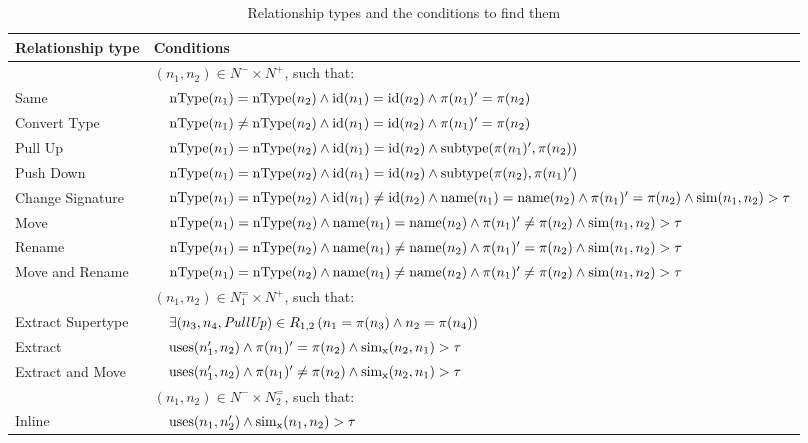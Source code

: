 \begin{table}[htbp]
\renewcommand{\arraystretch}{1.3}
\caption{Relationship types and the conditions to find them}
\label{TabRelationshipTypes}
\centering

\begin{tabular}{@{}lll@{}}
\toprule
Relationship type & \multicolumn{2}{l}{Conditions} \\
\midrule
& \multicolumn{2}{l}{$(n_1, n_2) \in N^- \times N^+$, such that:}\\
Same & & $\operatorname{nType}(n_1) = \operatorname{nType}(n_2) \land \operatorname{id}(n_1) = \operatorname{id}(n_2) \land \operatorname{\pi}(n_1)' = \operatorname{\pi}(n_2)$ \\
Convert Type & & $\operatorname{nType}(n_1) \neq \operatorname{nType}(n_2) \land \operatorname{id}(n_1) = \operatorname{id}(n_2) \land \operatorname{\pi}(n_1)' = \operatorname{\pi}(n_2)$ \\
Pull Up & & $\operatorname{nType}(n_1) = \operatorname{nType}(n_2) \land \operatorname{id}(n_1) = \operatorname{id}(n_2) \land \operatorname{subtype}(\operatorname{\pi}(n_1)', \operatorname{\pi}(n_2))$ \\
Push Down & & $\operatorname{nType}(n_1) = \operatorname{nType}(n_2) \land \operatorname{id}(n_1) = \operatorname{id}(n_2) \land \operatorname{subtype}(\operatorname{\pi}(n_2), \operatorname{\pi}(n_1)')$ \\
Change Signature & & $\operatorname{nType}(n_1) = \operatorname{nType}(n_2) \land \operatorname{id}(n_1) \neq \operatorname{id}(n_2) \land \operatorname{name}(n_1) = \operatorname{name}(n_2) \land \operatorname{\pi}(n_1)' = \operatorname{\pi}(n_2) \land \operatorname{sim}(n_1, n_2) > \tau$ \\
Move & & $\operatorname{nType}(n_1) = \operatorname{nType}(n_2) \land \operatorname{name}(n_1) = \operatorname{name}(n_2) \land \operatorname{\pi}(n_1)' \neq \operatorname{\pi}(n_2) \land \operatorname{sim}(n_1, n_2) > \tau$ \\
Rename & & $\operatorname{nType}(n_1) = \operatorname{nType}(n_2) \land \operatorname{name}(n_1) \neq \operatorname{name}(n_2) \land \operatorname{\pi}(n_1)' = \operatorname{\pi}(n_2) \land \operatorname{sim}(n_1, n_2) > \tau$ \\
Move and Rename & & $\operatorname{nType}(n_1) = \operatorname{nType}(n_2) \land \operatorname{name}(n_1) \neq \operatorname{name}(n_2) \land \operatorname{\pi}(n_1)' \neq \operatorname{\pi}(n_2) \land \operatorname{sim}(n_1, n_2) > \tau$ \\
\addlinespace
& \multicolumn{2}{l}{$(n_1, n_2) \in N_1^= \times N^+$, such that:}\\
Extract Supertype & & $\exists (n_3, n_4, \mathit{PullUp}) \in R_{1,2}\, (n_1 = \operatorname{\pi}(n_3) \land n_2 = \operatorname{\pi}(n_4))$ \\
Extract & & $\operatorname{uses}(n_1', n_2) \land \operatorname{\pi}(n_1)' = \operatorname{\pi}(n_2) \land \operatorname{sim_{x}}(n_2, n_1) > \tau$ \\
Extract and Move & & $\operatorname{uses}(n_1', n_2) \land \operatorname{\pi}(n_1)' \neq \operatorname{\pi}(n_2) \land \operatorname{sim_{x}}(n_2, n_1) > \tau$ \\
\addlinespace
& \multicolumn{2}{l}{$(n_1, n_2) \in N^- \times N_2^=$, such that:}\\
Inline & & $\operatorname{uses}(n_1, n_2') \land \operatorname{sim_{x}}(n_1, n_2) > \tau$ \\
\bottomrule
\end{tabular}


\end{table}
